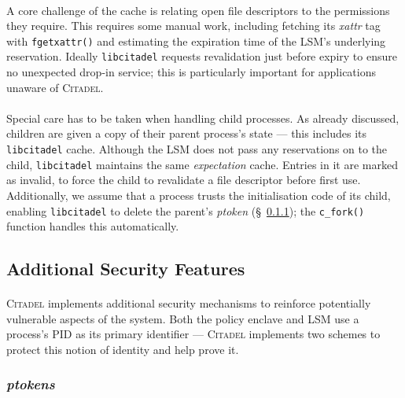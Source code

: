 \paragraph{} A core challenge of the cache is relating open file descriptors to the permissions they require. This requires some manual work, including fetching its \textit{xattr} tag with \texttt{fgetxattr()} and estimating the expiration time of the LSM's underlying reservation. Ideally \texttt{libcitadel} requests revalidation just before expiry to ensure no unexpected drop-in service; this is particularly important for applications unaware of \textsc{Citadel}.

\paragraph{} Special care has to be taken when handling child processes. As already discussed, children are given a copy of their parent process's state --- this includes its \texttt{libcitadel} cache. Although the LSM does not pass any reservations on to the child, \texttt{libcitadel} maintains the same \textit{expectation} cache. Entries in it are marked as invalid, to force the child to revalidate a file descriptor before first use. Additionally, we assume that a process trusts the initialisation code of its child, enabling \texttt{libcitadel} to delete the parent's \textit{ptoken} (§~\ref{sec:ptokens}); the \texttt{c\_fork()} function handles this automatically.


\subsection{Additional Security Features}
\label{sec:additional-security}
\paragraph{} \textsc{Citadel} implements additional security mechanisms to reinforce potentially vulnerable aspects of the system. Both the policy enclave and LSM use a process's PID as its primary identifier --- \textsc{Citadel} implements two schemes to protect this notion of identity and help prove it.

\subsubsection{\textit{ptokens}}
\label{sec:ptokens}
